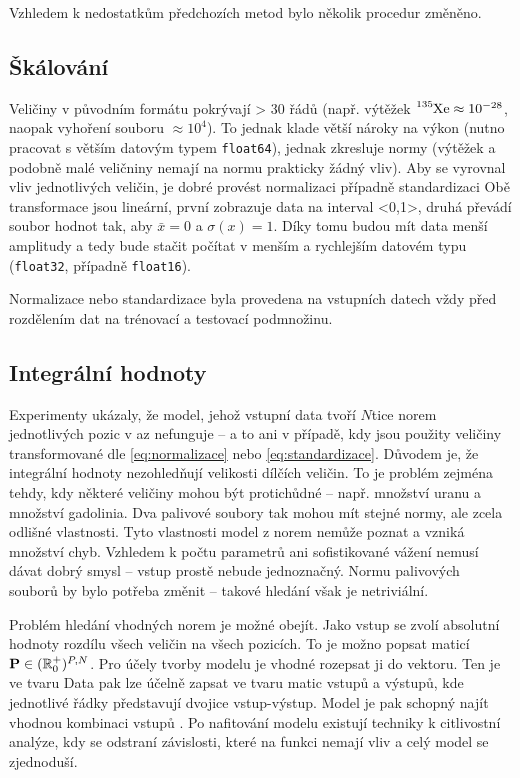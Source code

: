 Vzhledem k nedostatkům předchozích metod bylo několik procedur změněno. 

\subsection{Škálování}
Veličiny v původním formátu pokrývají > 30 řádů (např. výtěžek $\ce{^{135}Xe}\approx 10^{-28}$, naopak vyhoření souboru $\approx 10^4$). To jednak klade větší 
nároky na výkon (nutno pracovat s větším datovým typem \verb|float64|), jednak zkresluje normy (výtěžek a podobně malé veličniny nemají na normu prakticky žádný 
vliv). Aby se vyrovnal vliv jednotlivých veličin, je dobré provést normalizaci
případně standardizaci
Obě transformace jsou lineární, první zobrazuje data na interval <0,1>, druhá převádí soubor hodnot tak, aby $\bar{x}=0$ a $\sigma(x)=1$. Díky 
tomu budou mít data menší amplitudy a tedy bude stačit počítat v menším a rychlejším datovém typu (\verb|float32|, případně \verb|float16|). 

Normalizace nebo standardizace byla provedena na vstupních datech vždy před rozdělením dat na trénovací a testovací podmnožinu. 

\subsection{Integrální hodnoty}
Experimenty ukázaly, že model, jehož vstupní data tvoří $N$tice norem jednotlivých pozic v \ac{az} nefunguje -- a to ani v případě, kdy jsou použity 
veličiny transformované dle \eqref{eq:normalizace} nebo \eqref{eq:standardizace}. Důvodem je, že integrální hodnoty nezohledňují velikosti dílčích 
veličin. To je problém zejména tehdy, kdy některé veličiny mohou být protichůdné -- např. množství uranu a množství gadolinia. Dva palivové 
soubory tak mohou mít stejné normy, ale zcela odlišné vlastnosti. Tyto vlastnosti model z norem nemůže poznat a vzniká množství chyb. Vzhledem 
k počtu parametrů ani sofistikované vážení nemusí dávat dobrý smysl -- vstup prostě nebude jednoznačný. Normu palivových souborů by bylo 
potřeba změnit -- takové hledání však je netriviální. 

Problém hledání vhodných norem je možné obejít. Jako vstup se zvolí absolutní hodnoty rozdílu všech veličin na všech pozicích. 
To je možno popsat maticí $\mathbf{P}\in(\mathbb{R}_0^{+})^{P,N}$. 
Pro účely tvorby modelu je vhodné rozepsat ji do vektoru. Ten je ve tvaru 
Data pak lze účelně zapsat ve tvaru matic vstupů a výstupů, kde jednotlivé řádky představují dvojice vstup-výstup. Model je 
pak schopný najít vhodnou kombinaci vstupů . Po nafitování modelu existují techniky k citlivostní analýze, kdy se odstraní závislosti, které na 
funkci nemají vliv a celý model se zjednoduší. 

